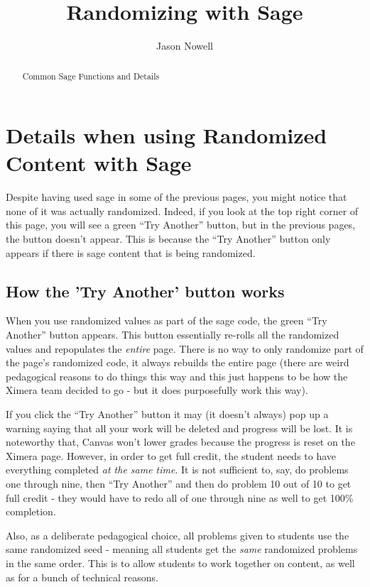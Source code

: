 \documentclass{ximera}
\title{Randomizing with Sage}
\author{Jason Nowell}
\begin{document}
\begin{abstract}
     Common Sage Functions and Details
\end{abstract}
\maketitle

\section{Details when using Randomized Content with Sage}
    Despite having used sage in some of the previous pages, you might notice that none of it was actually randomized. Indeed, if you look at the top right corner of this page, you will see a green ``Try Another'' button, but in the previous pages, the button doesn't appear. This is because the ``Try Another'' button only appears if there is sage content that is being randomized.
    
    \subsection{How the 'Try Another' button works}
        When you use randomized values as part of the sage code, the green ``Try Another'' button appears. This button essentially re-rolls all the randomized values and repopulates the \textit{entire} page. There is no way to only randomize part of the page's randomized code, it always rebuilds the entire page (there are weird pedagogical reasons to do things this way and this just happens to be how the Ximera team decided to go - but it does purposefully work this way).
        
        If you click the ``Try Another'' button it may (it doesn't always) pop up a warning saying that all your work will be deleted and progress will be lost. It is noteworthy that, Canvas won't lower grades because the progress is reset on the Ximera page. However, in order to get full credit, the student needs to have everything completed \textit{at the same time}. It is not sufficient to, say, do problems one through nine, then ``Try Another'' and then do problem 10 out of 10 to get full credit - they would have to redo all of one through nine as well to get 100\% completion.
        
        Also, as a deliberate pedagogical choice, all problems given to students use the same randomized seed - meaning all students get the \textit{same} randomized problems in the same order. This is to allow students to work together on content, as well as for a bunch of technical reasons.
\end{document}
